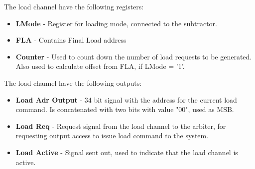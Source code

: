 \begin{appendix}
The load channel have the following registers:

\begin{itemize}
    \item \textbf{LMode} - Register for loading mode, connected to the subtractor.
    \item \textbf{FLA} - Contains Final Load address
    \item \textbf{Counter} - Used to count down the number of load requests to be generated. Also used to calculate offset from FLA, if LMode = '1'.
\end{itemize}

The load channel have the following outputs:

\begin{itemize}
    \item \textbf{Load Adr Output} - 34 bit signal with the address for the current load command. Is concatenated with two bits with value "00", used as MSB.
    \item \textbf{Load Req} - Request signal from the load channel to the arbiter, for requesting output access to issue load command to the system.   
    \item \textbf{Load Active} - Signal sent out, used to indicate that the load channel is active.
\end{itemize}


\end{appendix}
